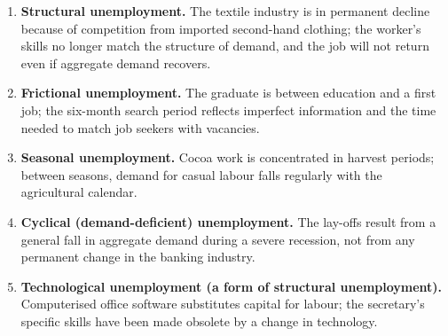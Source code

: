\documentclass[11pt]{article}
\begin{document}
\begin{corrige}
\begin{enumerate}
\item \textbf{Structural unemployment.} The textile industry is in permanent decline because of competition from imported second-hand clothing; the worker's skills no longer match the structure of demand, and the job will not return even if aggregate demand recovers.
\item \textbf{Frictional unemployment.} The graduate is between education and a first job; the six-month search period reflects imperfect information and the time needed to match job seekers with vacancies.
\item \textbf{Seasonal unemployment.} Cocoa work is concentrated in harvest periods; between seasons, demand for casual labour falls regularly with the agricultural calendar.
\item \textbf{Cyclical (demand-deficient) unemployment.} The lay-offs result from a general fall in aggregate demand during a severe recession, not from any permanent change in the banking industry.
\item \textbf{Technological unemployment (a form of structural unemployment).} Computerised office software substitutes capital for labour; the secretary's specific skills have been made obsolete by a change in technology.
\end{enumerate}
\end{corrige}
\end{document}

